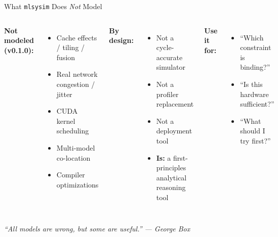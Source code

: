 \documentclass[aspectratio=169, 12pt]{beamer}
\begin{document}
\begin{frame}{What \texttt{mlsysim} Does \emph{Not} Model}
\begin{columns}[T]
\textbf{Not modeled (v0.1.0):}
\begin{itemize}
  \item Cache effects / tiling / fusion
  \item Real network congestion / jitter
  \item CUDA kernel scheduling
  \item Multi-model co-location
  \item Compiler optimizations
\end{itemize}

\textbf{By design:}
\begin{itemize}
  \item Not a cycle-accurate simulator
  \item Not a profiler replacement
  \item Not a deployment tool
  \item \textbf{Is:} a first-principles\\
        analytical reasoning tool
\end{itemize}

\vspace{0.5em}
\textbf{Use it for:}
\begin{itemize}
  \item ``Which constraint is binding?''
  \item ``Is this hardware sufficient?''
  \item ``What should I try first?''
\end{itemize}
\end{columns}

\vspace{0.5em}
\centering
\small\itshape
``All models are wrong, but some are useful.'' --- George Box
\end{frame}
\end{document}

